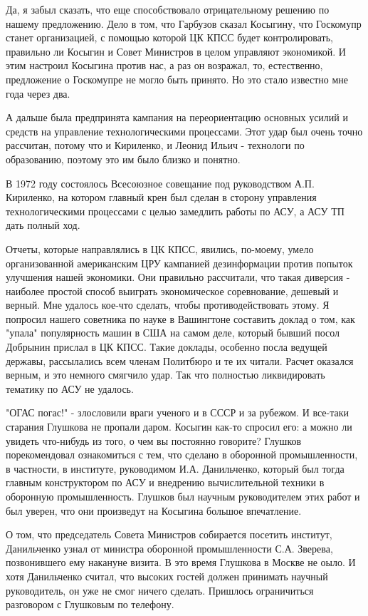 \documentclass{article}
\begin{document}
Да, я забыл сказать, что еще способствовало отрицательному решению по нашему
предложению. Дело в том, что Гарбузов сказал Косыгину, что Госкомупр станет
организацией, с помощью которой ЦК КПСС будет контролировать, правильно ли
Косыгин и Совет Министров в целом управляют экономикой. И этим настроил Косыгина
против нас, а раз он возражал, то, естественно, предложение о Госкомупре не
могло быть принято. Но это стало известно мне года через два.

А дальше была предпринята кампания на переориентацию основных усилий и средств
на управление технологическими процессами. Этот удар был очень точно рассчитан,
потому что и Кириленко, и Леонид Ильич - технологи по образованию, поэтому это
им было близко и понятно.

В 1972 году состоялось Всесоюзное совещание под руководством А.П. Кириленко, на
котором главный крен был сделан в сторону управления технологическими процессами
с целью замедлить работы по АСУ, а АСУ ТП дать полный ход.

Отчеты, которые направлялись в ЦК КПСС, явились, по-моему, умело организованной
американским ЦРУ кампанией дезинформации против попыток улучшения нашей
экономики. Они правильно рассчитали, что такая диверсия - наиболее простой
способ выиграть экономическое соревнование, дешевый и верный. Мне удалось
кое-что сделать, чтобы противодействовать этому. Я попросил нашего советника по
науке в Вашингтоне составить доклад о том, как "упала" популярность машин в США
на самом деле, который бывший посол Добрынин прислал в ЦК КПСС. Такие доклады,
особенно посла ведущей державы, рассылались всем членам Политбюро и те их
читали. Расчет оказался верным, и это немного смягчило удар. Так что полностью
ликвидировать тематику по АСУ не удалось.

"ОГАС погас!" - злословили враги ученого и в СССР и за рубежом. И все-таки
старания Глушкова не пропали даром. Косыгин как-то спросил его: а можно ли
увидеть что-нибудь из того, о чем вы постоянно говорите? Глушков порекомендовал
ознакомиться с тем, что сделано в оборонной промышленности, в частности, в
институте, руководимом И.А. Данильченко, который был тогда главным конструктором
по АСУ и внедрению вычислительной техники в оборонную промышленность. Глушков
был научным руководителем этих работ и был уверен, что они произведут на
Косыгина большое впечатление.

О том, что председатель Совета Министров собирается посетить институт,
Данильченко узнал от министра оборонной промышленности С.А. Зверева,
позвонившего ему накануне визита. В это время Глушкова в Москве не оыло. И хотя
Данильченко считал, что высоких гостей должен принимать научный руководитель, он
уже не смог ничего сделать. Пришлось ограничиться разговором с Глушковым по
телефону.
\end{document}
